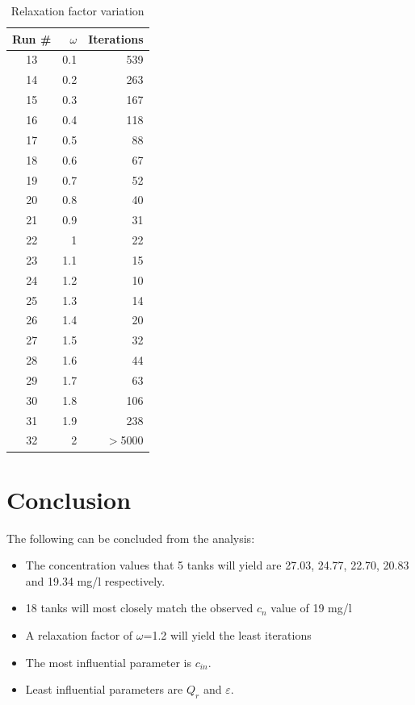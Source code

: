 \documentclass[titlepage,12pt]{article}
\begin{document}
\begin{table}[h]
\begin{center}
\caption{Relaxation factor variation}
\begin{tabular}{|c|r|r|}
\hline
{\bf Run \#} & {\bf $\omega$} & {\bf Iterations} \\
\hline
        13 &        0.1 &        539 \\
\hline
        14 &        0.2 &        263 \\
\hline
        15 &        0.3 &        167 \\
\hline
        16 &        0.4 &        118 \\
\hline
        17 &        0.5 &         88 \\
\hline
        18 &        0.6 &         67 \\
\hline
        19 &        0.7 &         52 \\
\hline
        20 &        0.8 &         40 \\
\hline
        21 &        0.9 &         31 \\
\hline
        22 &          1 &         22 \\
\hline
        23 &        1.1 &         15 \\
\hline
        24 &        1.2 &         10 \\
\hline
        25 &        1.3 &         14 \\
\hline
        26 &        1.4 &         20 \\
\hline
        27 &        1.5 &         32 \\
\hline
        28 &        1.6 &         44 \\
\hline
        29 &        1.7 &         63 \\
\hline
        30 &        1.8 &        106 \\
\hline
        31 &        1.9 &        238 \\
\hline
        32 &          2 &      $>$5000 \\
\hline
\end{tabular}
\end{center}
\end{table}

\section{Conclusion}
The following can be concluded from the analysis:
\begin{itemize}
\item{The concentration values that 5 tanks will yield are 27.03, 24.77, 22.70, 20.83 and
19.34 mg/l respectively.}
\item{18 tanks will most closely match the observed $c_n$ value of
19 mg/l}
\item{A relaxation factor of  $\omega$=1.2 will yield the least
iterations}
\item{The most influential parameter is $c_{in}$.}
\item{Least influential parameters are $Q_r$ and $\varepsilon$.}
\end{itemize}
\break
\end{document}
